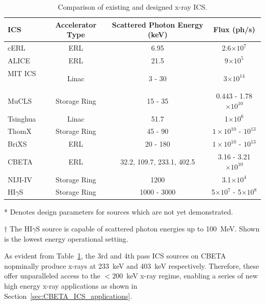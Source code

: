 \documentclass[../main.tex]{subfiles}
\begin{document}
\begin{table}[!h]
\caption{Comparison of existing and designed x-ray ICS. \textcolor{}{}}
\begin{threeparttable}
\begin{tabular}{lccc}
\hline\hline
ICS & Accelerator Type & Scattered Photon Energy (\si{\kilo\electronvolt}) & Flux (ph/\si{\second}) \\
\hline
cERL \cite{akagi2016narrow} & ERL & 6.95 & 2.6$\times 10^{7}$ \\ 
ALICE \cite{priebe2008inverse,priebe2010first} & ERL & 21.5 & 9$\times 10^{5}$ \\
MIT ICS\tnote{*} ~\cite{graves2014compact} & Linac & 3 - 30 & 3$\times 10^{14}$ \\
MuCLS \cite{eggl2016munich} & Storage Ring & 15 - 35 & 0.443 - 1.78$\times 10^{10}$ \\ 
Tsinghua \cite{du2013generation} & Linac & 51.7 & 1$\times 10^{6}$ \\
ThomX\tnote{*} ~\cite{variola2014thomx,dupraz2020thomx} & Storage Ring & 45 - 90 & $1\times 10^{10}$ - $10^{13}$ \\
BriXS\tnote{*} ~\cite{faillace2019status,drebot2019brixs,cardarelli2020brixs} & ERL & 20 - 180 & $1\times 10^{10}$ - $10^{13}$ \\
CBETA\tnote{*} & ERL & 32.2, 109.7, 233.1, 402.5 & 3.16 - 3.21$\times 10^{10}$ \\ 
NIJI-IV \cite{sei2017demonstration} & Storage Ring & 1200 & 3.1$\times 10^{4}$ \\ 
HI$\gamma$S\tnote{$\dagger$} ~\cite{weller2009research} & Storage Ring & 1000 - 3000 & 5$\times 10^{7}$ - 5$\times 10^{8}$ \\
\hline\hline
\end{tabular}
\begin{tablenotes}
\item[*]{Denotes design parameters for sources which are not yet demonstrated.}
\item[$\dagger$]{The HI$\gamma$S source is capable of scattered photon energies up to 100~\si{\mega\electronvolt}. Shown is the lowest energy operational setting.}
\end{tablenotes}
\end{threeparttable}
\label{tab:xray_ICS_comparison}
\end{table}

As evident from Table~\ref{tab:xray_ICS_comparison}, the 3rd and 4th pass ICS sources on CBETA nopminally produce x-rays at 233~\si{\kilo\electronvolt} and 403~\si{\kilo\electronvolt} respectively. Therefore, these offer unparalleled access to the $< 200$~\si{\kilo\electronvolt} x-ray regime, enabling a series of new high energy x-ray applications as shown in Section~\ref{sec:CBETA_ICS_applications}.
\end{document}
